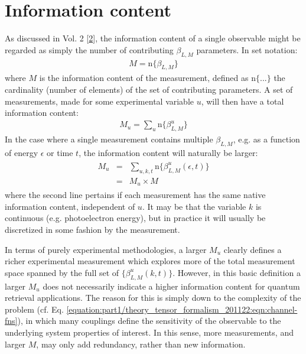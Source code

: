 \documentclass[letterpaper,table,10pt,english]{jupyterBook}
\begin{document}
\section{Information content}
\label{\detokenize{part1/theory_info_content_221122:information-content}}\label{\detokenize{part1/theory_info_content_221122:sec-info-content}}\label{\detokenize{part1/theory_info_content_221122::doc}}
\sphinxAtStartPar
As discussed in  Vol. 2 {[}\hyperlink{cite.backmatter/bibliography:id570}{2}{]}, the information content of a single observable might be regarded as simply the number of contributing \(\beta_{L,M}\) parameters. In set notation:
\begin{equation}\label{equation:part1/theory_info_content_221122:eq:BLM-set}
\begin{split}M=\mathrm{n}\{\beta_{L,M}\}\end{split}
\end{equation}
\sphinxAtStartPar
where \(M\) is the information content of the measurement, defined as
\(\mathrm{n}\{...\}\) the cardinality (number of elements) of the set of
contributing parameters. A set of measurements, made for some
experimental variable \(u\), will then have a total information content:
\begin{equation*}
\begin{split}M_{u}=\sum_{u}\mathrm{n}\{\beta_{L,M}^{u}\}\end{split}
\end{equation*}
\sphinxAtStartPar
In the case where a single measurement contains multiple \(\beta_{L,M}\),
e.g. as a function of energy \(\epsilon\) or time \(t\), the information
content will naturally be larger:
\begin{equation*}
\begin{split}\begin{aligned}
M_{u} & = & \sum_{u,k,t}\mathrm{n}\{\beta_{L,M}^{u}(\epsilon,t)\}\\
 & = & M_{u}\times M\end{aligned}\end{split}
\end{equation*}
\sphinxAtStartPar
where the second line pertains if each measurement has the same native
information content, independent of \(u\). It may be that the variable \(k\)
is continuous (e.g. photoelectron energy), but in practice it will
usually be discretized in some fashion by the measurement.

\sphinxAtStartPar
In terms of purely experimental methodologies, a larger \(M_{u}\) clearly
defines a richer experimental measurement which explores more of the
total measurement space spanned by the full set of
\(\{\beta_{L,M}^{u}(k,t)\}\). However, in this basic definition a larger
\(M_{u}\) does not necessarily indicate a higher information content for
quantum retrieval applications. The reason for this is simply down to
the complexity of the problem (cf. Eq. \eqref{equation:part1/theory_tensor_formalism_201122:eqn:channel-fns}), in which many couplings define the sensitivity of the observable to the underlying system properties of
interest. In this sense, more measurements, and larger \(M\), may only add
redundancy, rather than new information.
\end{document}
